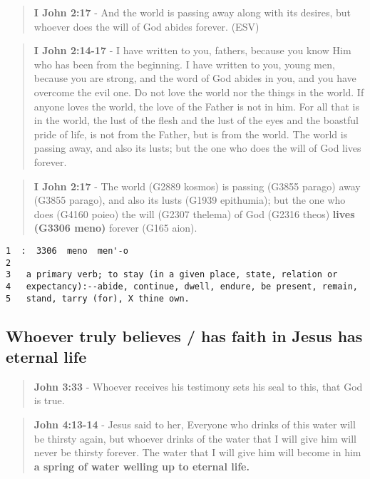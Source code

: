 \documentclass[11pt]{article}
\begin{document}
\begin{quote}
\textbf{I John 2:17} - And the world is passing away along with its desires, but whoever does the will of God abides forever. (ESV)
\end{quote}

\begin{quote}
\textbf{I John 2:14-17} - I have written to you, fathers, because you know Him who has been from the beginning. I have written to you, young men, because you are strong, and the word of God abides in you, and you have overcome the evil one.  Do not love the world nor the things in the world. If anyone loves the world, the love of the Father is not in him.  For all that is in the world, the lust of the flesh and the lust of the eyes and the boastful pride of life, is not from the Father, but is from the world.  The world is passing away, and also its lusts; but the one who does the will of God lives forever.
\end{quote}

\begin{quote}
\textbf{I John 2:17} - The world (G2889 kosmos) is passing (G3855 parago) away (G3855 parago), and also its lusts (G1939 epithumia); but the one who does (G4160 poieo) the will (G2307 thelema) of God (G2316 theos) \textbf{lives (G3306 meno)} forever (G165 aion).
\end{quote}

\begin{verbatim}
1  :  3306  meno  men'-o
2  
3   a primary verb; to stay (in a given place, state, relation or
4   expectancy):--abide, continue, dwell, endure, be present, remain,
5   stand, tarry (for), X thine own.
\end{verbatim}

\subsection{Whoever truly believes / has faith in Jesus has eternal life}
\label{sec:org2343b91}

\begin{quote}
\textbf{John 3:33} - Whoever receives his testimony sets his seal to this, that God is true.
\end{quote}

\begin{quote}
\textbf{John 4:13-14} - Jesus said to her, Everyone who drinks of this water will be thirsty again, but whoever drinks of the water that I will give him will never be thirsty forever. The water that I will give him will become in him \textbf{a spring of water welling up to eternal life.}
\end{quote}
\end{document}
